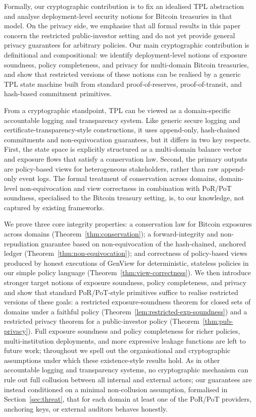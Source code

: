 \documentclass[11pt]{article}
\begin{document}
Formally, our cryptographic contribution is to fix an idealised TPL abstraction and analyse deployment-level security notions for Bitcoin treasuries in that model. On the privacy side, we emphasise that all formal results in this paper concern the restricted public-investor setting and do not yet provide general privacy guarantees for arbitrary policies.
Our main cryptographic contribution is definitional and compositional: we identify deployment-level notions of exposure soundness, policy completeness, and privacy for multi-domain Bitcoin treasuries, and show that restricted versions of these notions can be realised by a generic TPL state machine built from standard proof-of-reserves, proof-of-transit, and hash-based commitment primitives.

From a cryptographic standpoint, TPL can be viewed as a domain-specific accountable logging and transparency system. Like generic secure logging and certificate-transparency-style constructions, it uses append-only, hash-chained commitments and non-equivocation guarantees, but it differs in two key respects. First, the state space is explicitly structured as a multi-domain balance vector and exposure flows that satisfy a conservation law. Second, the primary outputs are policy-based views for heterogeneous stakeholders, rather than raw append-only event logs. The formal treatment of conservation across domains, domain-level non-equivocation and view correctness in combination with PoR/PoT soundness, specialised to the Bitcoin treasury setting, is, to our knowledge, not captured by existing frameworks.

We prove three core integrity properties: a conservation law for Bitcoin exposures across domains (Theorem~\ref{thm:conservation}); a forward-integrity and non-repudiation guarantee based on non-equivocation of the hash-chained, anchored ledger (Theorem~\ref{thm:non-equivocation}); and correctness of policy-based views produced by honest executions of \textsf{GenView} for deterministic, stateless policies in our simple policy language (Theorem~\ref{thm:view-correctness}).
We then introduce stronger target notions of exposure soundness, policy completeness, and privacy and show that standard PoR/PoT-style primitives suffice to realise restricted versions of these goals: a restricted exposure-soundness theorem for closed sets of domains under a faithful policy (Theorem~\ref{lem:restricted-exp-soundness}) and a restricted privacy theorem for a public-investor policy (Theorem~\ref{thm:pub-privacy}).
Full exposure soundness and policy completeness for richer policies, multi-institution deployments, and more expressive leakage functions are left to future work; throughout we spell out the organisational and cryptographic assumptions under which these existence-style results hold. As in other accountable logging and transparency systems, no cryptographic mechanism can rule out full collusion between all internal and external actors; our guarantees are instead conditioned on a minimal non-collusion assumption, formalised in Section~\ref{sec:threat}, that for each domain at least one of the PoR/PoT providers, anchoring keys, or external auditors behaves honestly.
\end{document}
